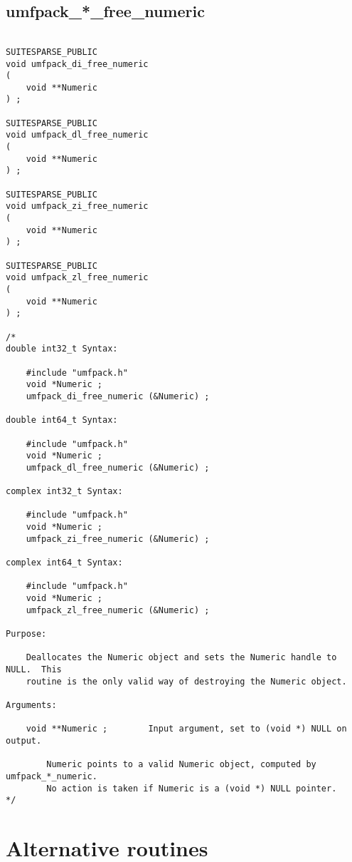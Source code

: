 \documentclass[11pt]{article}
\begin{document}
\newpage
\subsection{umfpack\_*\_free\_numeric}

{\footnotesize
\begin{verbatim}

SUITESPARSE_PUBLIC
void umfpack_di_free_numeric
(
    void **Numeric
) ;

SUITESPARSE_PUBLIC
void umfpack_dl_free_numeric
(
    void **Numeric
) ;

SUITESPARSE_PUBLIC
void umfpack_zi_free_numeric
(
    void **Numeric
) ;

SUITESPARSE_PUBLIC
void umfpack_zl_free_numeric
(
    void **Numeric
) ;

/*
double int32_t Syntax:

    #include "umfpack.h"
    void *Numeric ;
    umfpack_di_free_numeric (&Numeric) ;

double int64_t Syntax:

    #include "umfpack.h"
    void *Numeric ;
    umfpack_dl_free_numeric (&Numeric) ;

complex int32_t Syntax:

    #include "umfpack.h"
    void *Numeric ;
    umfpack_zi_free_numeric (&Numeric) ;

complex int64_t Syntax:

    #include "umfpack.h"
    void *Numeric ;
    umfpack_zl_free_numeric (&Numeric) ;

Purpose:

    Deallocates the Numeric object and sets the Numeric handle to NULL.  This
    routine is the only valid way of destroying the Numeric object.

Arguments:

    void **Numeric ;        Input argument, set to (void *) NULL on output.

        Numeric points to a valid Numeric object, computed by umfpack_*_numeric.
        No action is taken if Numeric is a (void *) NULL pointer.
*/
\end{verbatim}
}

\newpage
\section{Alternative routines}
\label{Alternative}
\end{document}
